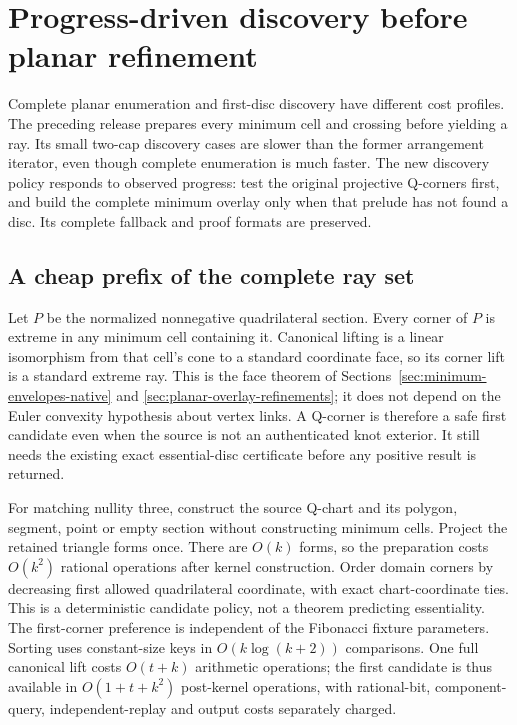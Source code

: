 \section{Progress-driven discovery before planar refinement}
\label{sec:planar-adaptive}

Complete planar enumeration and first-disc discovery have different cost
profiles. The preceding release prepares every minimum cell and crossing
before yielding a ray. Its small two-cap discovery cases are slower than
the former arrangement iterator, even though complete enumeration is much
faster. The new discovery policy responds to observed progress: test the
original projective Q-corners first, and build the complete minimum overlay
only when that prelude has not found a disc. Its complete fallback and
proof formats are preserved.

\subsection{A cheap prefix of the complete ray set}

Let $P$ be the normalized nonnegative quadrilateral section. Every corner
of $P$ is extreme in any minimum cell containing it. Canonical lifting is
a linear isomorphism from that cell's cone to a standard coordinate face,
so its corner lift is a standard extreme ray. This is the face theorem of
Sections~\ref{sec:minimum-envelopes-native} and
\ref{sec:planar-overlay-refinements}; it does not depend on the Euler
convexity hypothesis about vertex links. A Q-corner is therefore a safe
first candidate even when the source is not an authenticated knot exterior.
It still needs the existing exact essential-disc certificate before any
positive result is returned.

For matching nullity three, construct the source Q-chart and its polygon,
segment, point or empty section without constructing minimum cells.
Project the retained triangle forms once. There are $O(k)$ forms, so the
preparation costs $O(k^2)$ rational operations after kernel construction.
Order domain corners by decreasing first allowed quadrilateral coordinate,
with exact chart-coordinate ties. This is a deterministic candidate policy,
not a theorem predicting essentiality. The first-corner preference is
independent of the Fibonacci fixture parameters. Sorting uses constant-size
keys in $O(k\log(k+2))$ comparisons. One full canonical lift costs
$O(t+k)$ arithmetic operations; the first candidate is thus available in
$O(1+t+k^2)$ post-kernel operations, with rational-bit, component-query,
independent-replay and output costs separately charged.

